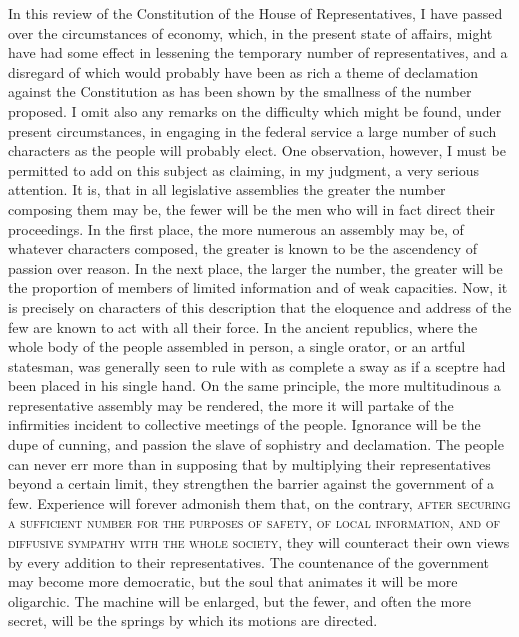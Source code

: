 In this review of the Constitution of the House of Representatives, I have passed over the circumstances of economy, which, in the present state of affairs, might have had some effect in lessening the temporary number of representatives, and a disregard of which would probably have been as rich a theme of declamation against the Constitution as has been shown by the smallness of the number proposed. 
I omit also any remarks on the difficulty which might be found, under present circumstances, in engaging in the federal service a large number of such characters as the people will probably elect. 
One observation, however, I must be permitted to add on this subject as claiming, in my judgment, a very serious attention. 
It is, that in all legislative assemblies the greater the number composing them may be, the fewer will be the men who will in fact direct their proceedings. 
In the first place, the more numerous an assembly may be, of whatever characters composed, the greater is known to be the ascendency of passion over reason. 
In the next place, the larger the number, the greater will be the proportion of members of limited information and of weak capacities. 
Now, it is precisely on characters of this description that the eloquence and address of the few are known to act with all their force. 
In the ancient republics, where the whole body of the people assembled in person, a single orator, or an artful statesman, was generally seen to rule with as complete a sway as if a sceptre had been placed in his single hand. 
On the same principle, the more multitudinous a representative assembly may be rendered, the more it will partake of the infirmities incident to collective meetings of the people. 
Ignorance will be the dupe of cunning, and passion the slave of sophistry and declamation. 
The people can never err more than in supposing that by multiplying their representatives beyond a certain limit, they strengthen the barrier against the government of a few. 
Experience will forever admonish them that, on the contrary, \textsc{after securing a sufficient number for the purposes of safety}, \textsc{of local information}, \textsc{and of diffusive sympathy with the whole society}, they will counteract their own views by every addition to their representatives. 
The countenance of the government may become more democratic, but the soul that animates it will be more oligarchic. 
The machine will be enlarged, but the fewer, and often the more secret, will be the springs by which its motions are directed.

